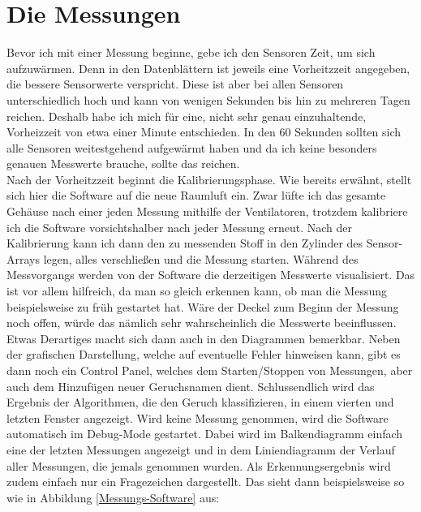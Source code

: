 \documentclass[10pt]{article}
\begin{document}
\section{Die Messungen}
Bevor ich mit einer Messung beginne, gebe ich den Sensoren Zeit, um sich aufzuwärmen.
Denn in den Datenblättern ist jeweils eine Vorheitzzeit angegeben, die bessere Sensorwerte verspricht.
Diese ist aber bei allen Sensoren unterschiedlich hoch und kann von wenigen Sekunden bis hin zu mehreren Tagen reichen.
Deshalb habe ich mich für eine, nicht sehr genau einzuhaltende, Vorheizzeit von etwa einer Minute entschieden. In den 60 Sekunden
sollten sich alle Sensoren weitestgehend aufgewärmt haben und da ich keine besonders genauen Messwerte brauche, sollte das reichen.\\
Nach der Vorheitzzeit beginnt die Kalibrierungsphase. Wie bereits erwähnt, stellt sich hier die Software auf die neue Raumluft ein.
Zwar lüfte ich das gesamte Gehäuse nach einer jeden Messung mithilfe der Ventilatoren, trotzdem kalibriere ich die Software vorsichtshalber
nach jeder Messung erneut. Nach der Kalibrierung kann ich dann den zu messenden Stoff in den Zylinder des Sensor-Arrays legen,
alles verschließen und die Messung starten. Während des Messvorgangs werden von der Software die derzeitigen Messwerte visualisiert. Das ist vor allem hilfreich, da man so gleich erkennen
kann, ob man die Messung beispielsweise zu früh gestartet hat. Wäre der Deckel zum Beginn der Messung noch offen, würde das nämlich sehr wahrscheinlich die Messwerte beeinflussen.
Etwas Derartiges macht sich dann auch in den Diagrammen bemerkbar. Neben der grafischen Darstellung, welche auf eventuelle Fehler hinweisen kann, gibt es dann noch ein Control Panel, welches dem 
Starten/Stoppen von Messungen, aber auch dem Hinzufügen neuer Geruchsnamen dient. Schlussendlich wird das Ergebnis der Algorithmen, die den Geruch klassifizieren, in einem vierten und letzten
Fenster angezeigt. Wird keine Messung genommen, wird die Software automatisch im Debug-Mode gestartet. Dabei wird im Balkendiagramm einfach eine der letzten Messungen angezeigt und
in dem Liniendiagramm der Verlauf aller Messungen, die jemals genommen wurden. Als Erkennungsergebnis wird zudem einfach nur ein Fragezeichen dargestellt. 
Das sieht dann beispielsweise so wie in Abbildung \ref{Messungs-Software} aus:
\end{document}
